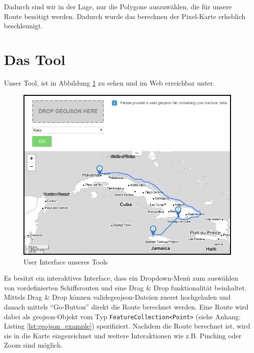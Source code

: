 \documentclass[letterpaper]{article}
\begin{document}
	Dadurch sind wir in der Lage, nur die Polygone auszuwählen, die für unsere Route benötigt werden. Dadurch wurde das berechnen der Pixel-Karte erheblich beschleunigt.

\section{Das Tool}
	Unser Tool, ist in Abbildung \ref{fig:tool} zu sehen und im Web erreichbar unter\footnotemark.


	\begin{figure}[htbp]
		\centering
		\includegraphics[width=\linewidth]{tool}
		\caption{User Interface unseres Tools}
		\label{fig:tool}
	\end{figure}

	Es besitzt ein interaktives Interface, dass ein Dropdown-Menü zum auswählen von vordefinierten Schiffsrouten und eine Drag \& Drop funktionalität beinhaltet. 
	Mittels Drag \& Drop können valide\footnotemark geojson-Dateien zuerst hochgeladen und danach mittels "`Go-Button"' direkt die Route berechnet werden. Eine Route wird dabei als geojson-Objekt vom Typ \texttt{FeatureCollection<Point>} (siehe Anhang: Listing \ref{lst:geojson_example}) spezifiziert.
	Nachdem die Route berechnet ist, wird sie in die Karte eingezeichnet und weitere Interaktionen wie z.B. Pinching oder Zoom sind möglich.

\end{document}
